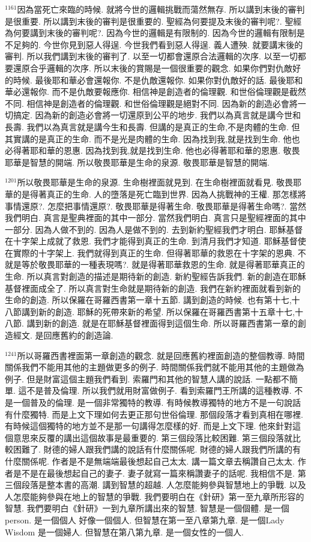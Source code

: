 \documentclass{book}
\begin{document}
$^{1161}$因為當死亡來臨的時候.
就將今世的邏輯挑戰而蕩然無存.
所以講到末後的審判是很重要.
所以講到末後的審判是很重要的.
聖經為何要提及末後的審判呢?.
聖經為何要講到末後的審判呢?.
因為今世的邏輯是有限制的.
因為今世的邏輯有限制是不足夠的.
今世你見到惡人得逞.
今世我們看到惡人得逞.
義人遭殃.
就要講末後的審判.
所以我們講到末後的審判了.
以至一切都會還原合法邏輯的次序.
以至一切都要還原合乎邏輯的次序.
所以末後的賞賜是一個很重要的觀念.
如果你們對仇敵好的時候.
最後耶和華必會還報你.
不是仇敵還報你.
如果你對仇敵好的話.
最後耶和華必還報你.
而不是仇敵要報應你.
相信神是創造者的倫理觀.
和世俗倫理觀是截然不同.
相信神是創造者的倫理觀.
和世俗倫理觀是絕對不同.
因為新的創造必會將一切搞定.
因為新的創造必會將一切還原到公平的地步.
我們以為真言就是講今世和長壽.
我們以為真言就是講今生和長壽.
但講的是真正的生命,不是肉體的生命.
但其實講的是真正的生命.
而不是光是肉體的生命.
因為找到我,就是找到生命.
他也必得著耶和華的恩惠.
因為找到我,就是找到生命.
他也必得著耶和華的恩惠.
敬畏耶華是智慧的開端.
所以敬畏耶華是生命的泉源.
敬畏耶華是智慧的開端.

$^{1201}$所以敬畏耶華是生命的泉源.
生命樹裡面就見到.
在生命樹裡面就看見.
敬畏耶華的是得著真正的生命.
人的墮落是死亡臨到世界.
因為人挑戰神的王權.
那怎樣將事情還原?.
怎麼把事情還原?.
敬畏耶華是得著生命.
敬畏耶華是得著生命嗎?.
當然我們明白.
真言是聖典裡面的其中一部分.
當然我們明白.
真言只是聖經裡面的其中一部分.
因為人做不到的.
因為人是做不到的.
去到新約聖經我們才明白.
耶穌基督在十字架上成就了救恩.
我們才能得到真正的生命.
到清月我們才知道.
耶穌基督使在實際的十字架上.
我們就得到真正的生命.
但得著耶華的救恩在十字架的恩典.
不就是等於敬畏耶華的一種表現嗎?.
就是得著耶華救恩的生命.
就是得著耶華真正的生命.
所以真言對創造的描述是期待新的創造.
新約聖經告訴我們.
新的創造在耶穌基督裡面成全了.
所以真言對生命就是期待新的創造.
我們在新約裡面就看到新的生命的創造.
所以保羅在哥羅西書第一章十五節.
講到創造的時候.
也有第十七,十八節講到新的創造.
耶穌的死帶來新的希望.
所以保羅在哥羅西書第十五章十七,十八節.
講到新的創造.
就是在耶穌基督裡面得到這個生命.
所以哥羅西書第一章的創造經文.
是回應舊約的創造論.

$^{1241}$所以哥羅西書裡面第一章創造的觀念.
就是回應舊約裡面創造的整個教導.
時間關係我們不能用其他的主題做更多的例子.
時間關係我們就不能用其他的主題做為例子.
但是財富這個主題我們看到.
索羅門和其他的智慧人講的說話.
一點都不簡單.
這不是普及倫理.
所以我們就用財富做例子.
看到索羅門王所講的這種教導.
不是一個普及的倫理.
是一個非常獨特的教導.
有時候教導獨特的地方不是一句說話有什麼獨特.
而是上文下理如何去更正那句世俗倫理.
那個段落才看到真相在哪裡.
有時候這個獨特的地方並不是那一句講得怎麼樣的好.
而是上文下理.
他來針對這個意思來反覆的講出這個故事是最重要的.
第三個段落比較困難.
第三個段落就比較困難了.
財德的婦人跟我們講的說話有什麼關係呢.
財德的婦人跟我們所講的有什麼關係呢.
作者是不是無端端最後想起自己太太.
講一篇文章去稱讚自己太太.
作者是不是在最後想起自己的妻子.
妻子就寫一篇來稱讚妻子的話呢.
我相信不是.
第三個段落是整本書的高潮.
講到智慧的超越.
人怎麼能夠參與智慧地上的爭戰.
以及人怎麼能夠參與在地上的智慧的爭戰.
我們要明白在《針研》第一至九章所形容的智慧.
我們要明白《針研》一到九章所講出來的智慧.
智慧是一個個體.
是一個person.
是一個個人 好像一個個人.
但智慧在第一至八章第九章.
是一個Lady Wisdom 是一個婦人.
但智慧在第八第九章.
是一個女性的一個人.
\end{document}
